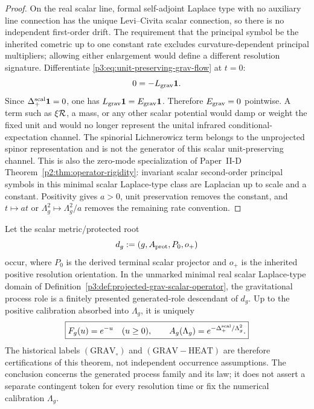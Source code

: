 \documentclass[12pt,a4paper]{article}
\begin{document}
\begin{proof}
On the real scalar line, formal self-adjoint Laplace type with no auxiliary
line connection has the unique Levi--Civita scalar connection, so there is no
independent first-order drift.  The requirement that the principal symbol be
the inherited cometric up to one constant rate excludes curvature-dependent
principal multipliers; allowing either enlargement would define a different
resolution signature.  Differentiate
\eqref{p3:eq:unit-preserving-grav-flow} at \(t=0\):
\[
 0=-L_{\rm grav}\mathbf1.
\]
Since \(\Delta_+^{\rm scal}\mathbf1=0\), one has
\(L_{\rm grav}\mathbf1=E_{\rm grav}\mathbf1\).  Therefore
\(E_{\rm grav}=0\) pointwise.  A term such as \(\xi\mathcal R\), a mass, or any
other scalar potential would damp or weight the fixed unit and would no longer
represent the unital infrared conditional-expectation channel.  The spinorial
Lichnerowicz term belongs to the unprojected spinor representation and is not
the generator of this scalar unit-preserving channel.  This is also the
zero-mode specialization of Paper~II-D
Theorem~\ref{p2:thm:operator-rigidity}: invariant scalar second-order
principal symbols in this minimal scalar Laplace-type class are Laplacian up
to scale and a constant.  Positivity gives \(a>0\), unit preservation removes
the constant, and
\(t\mapsto at\) or \(\Lambda_g^2\mapsto\Lambda_g^2/a\) removes the remaining
rate convention.
\end{proof}

\begin{theorem}
\label{p3e:thm:generated-gravitational-heat-role}
Let the scalar metric/protected root
\[
 d_g:=(g,A_{\rm prot},P_0,o_+)
\]
occur, where \(P_0\) is the derived terminal scalar projector and \(o_+\)
is the inherited positive resolution orientation.  In the unmarked minimal
real scalar Laplace-type domain of
Definition~\ref{p3:def:projected-grav-scalar-operator}, the gravitational
process role is a finitely presented generated-role descendant of \(d_g\).
Up to the positive calibration absorbed into \(\Lambda_g\), it is uniquely
\[
\boxed{
 F_g(u)=e^{-u}\quad(u\ge0),\qquad
 A_g(\Lambda_g)=e^{-\Delta_+^{\rm scal}/\Lambda_g^2}.}
\]
The historical labels \((\mathrm{GRAV}_{\circ})\) and
\((\mathrm{GRAV\!-\!HEAT})\) are therefore certifications of this theorem,
not independent occurrence assumptions.  The conclusion concerns the
generated process family and its law; it does not assert a separate
contingent token for every resolution time or fix the numerical calibration
\(\Lambda_g\).
\end{theorem}
\end{document}

